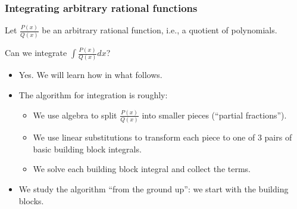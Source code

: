 \begin{frame}
\frametitle{Integrating arbitrary rational functions}
Let $\frac{P(x)}{Q(x)}$ be an arbitrary rational function, i.e., a quotient of polynomials.
\begin{question}
Can we integrate $\displaystyle\int \frac{P(x)}{Q(x)}dx$?
\end{question}
\begin{itemize}
\item<2-> Yes. We will learn how in what follows.
\item<3-> The algorithm for integration is roughly:
\begin{itemize}
\item<4-> We use algebra to split $\frac{P(x)}{Q(x)}$ into smaller pieces (``partial fractions''). 
\item<5-> We use linear substitutions to transform each piece to one of $3$ pairs of basic building block integrals. 
\item<6-> We solve each building block integral and collect the terms.
\end{itemize}
\item<7-> We study the algorithm ``from the ground up'': we start with the building blocks.
\end{itemize}
\end{frame}

